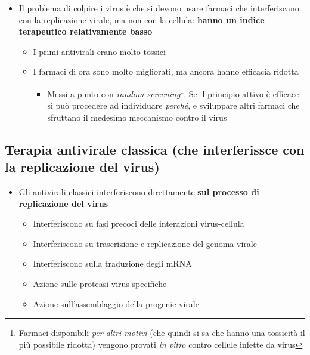 \documentclass[italian,]{article}
\providecommand{\tightlist}{%
  \setlength{\itemsep}{0pt}\setlength{\parskip}{0pt}}
\begin{document}
\begin{itemize}
\tightlist
\item
  Il problema di colpire i virus è che si devono usare farmaci che
  interferiscano con la replicazione virale, ma non con la cellula:
  \textbf{hanno un indice terapeutico relativamente basso}

  \begin{itemize}
  \tightlist
  \item
    I primi antivirali erano molto tossici
  \item
    I farmaci di ora sono molto migliorati, ma ancora hanno efficacia
    ridotta

    \begin{itemize}
    \tightlist
    \item
      Messi a punto con \emph{random screening}\footnote{Farmaci
        disponibili \emph{per altri motivi} (che quindi si sa che hanno
        una tossicità il più possibile ridotta) vengono provati \emph{in
        vitro} contro cellule infette da virus}. Se il principio attivo
      è efficace si può procedere ad individuare \emph{perché}, e
      sviluppare altri farmaci che sfruttano il medesimo meccanismo
      contro il virus
    \end{itemize}
  \end{itemize}
\end{itemize}

\hypertarget{terapia-antivirale-classica-che-interferissce-con-la-replicazione-del-virus}{%
\subsection{Terapia antivirale classica (che interferissce con la
replicazione del
virus)}\label{terapia-antivirale-classica-che-interferissce-con-la-replicazione-del-virus}}

\begin{itemize}
\tightlist
\item
  Gli antivirali classici interferiscono direttamente \textbf{sul
  processo di replicazione del virus}

  \begin{itemize}
  \tightlist
  \item
    Interferiscono su fasi precoci delle interazioni virus-cellula
  \item
    Interferiscono su trascrizione e replicazione del genoma virale
  \item
    Interferiscono sulla traduzione degli mRNA
  \item
    Azione sulle proteasi virus-specifiche
  \item
    Azione sull'assemblaggio della progenie virale
  \end{itemize}
\end{itemize}
\end{document}
